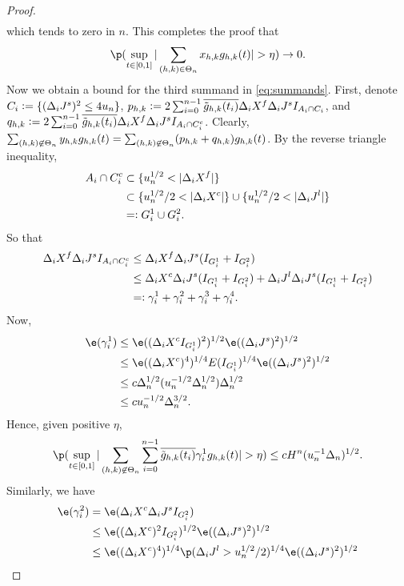 \begin{proof}
\begin{align}
\end{align}
which tends to zero in $n$.  This completes the proof that \begin{align}\label{eq:x} \p(\sup_{t \in [0,1]}\vert \sumt x_{h,k} \ghk(t) \vert > \eta) \to 0. \end{align}
Now we obtain a bound for the third summand in  \eqref{eq:summands}. First, denote $C_i := \{( \Delta_i J^s )^2 \le 4 u_n\}$, $p_{h,k} : = 2 \sum_{i = 0}^{n-1} \overline{\tilde{g}_{h,k}(t_i)}\Delta_i X^f \Delta_i J^s I_{A_i \cap C_i}$, and $q_{h,k} := 2 \sum_{i = 0}^{n-1} \overline{\tilde{g}_{h,k}(t_i)}\Delta_i X^f \Delta_i J^s I_{A_i \cap C_i^c}$. Clearly, $\sum_{(h,k) \not\in \Theta_n} y_{h,k} g_{h,k}(t)  = \sum_{(h,k) \not\in \Theta_n} (p_{h,k} + q_{h,k}) g_{h,k}(t)$. By the reverse triangle inequality,
\begin{align}
  A_i \cap C_i^c &\subset \{ u_n^{1/2} < \vert \Delta_i X^f \vert  \}\notag\\
  & \subset \{ u_n^{1/2}/2 < \vert \Delta_i X^c \vert  \} \cup  \{ u_n^{1/2}/2 < \vert \Delta_i J^l \vert  \}\notag\\
  &=: G^1_i \cup G^2_i\notag.
  \label{}
\end{align}
So that 
\begin{align}
  \Delta_i X^f \Delta_i J^s I_{A_i \cap C_i^c} &\le \Delta_i X^f \Delta_i J^s  (I_{G^1_i} +  I_{G^2_i}) \notag\\
  & \le \Delta_i X^c \Delta_i J^s(I_{G^1_i} +  I_{G^2_i}) + \Delta_i J^l \Delta_i J^s(I_{G^1_i} +  I_{G^2_i}) \notag \\
  & =: \gamma_i^1 + \gamma_i^2 + \gamma_i^3 + \gamma^4_i.\notag 
\end{align}
Now,
\begin{align}
  \e(\gamma_i^1) &\le  \e( (\dxc  I_{G^1_i})^2)^{1/2} \e( (\djt)^2)^{1/2} \notag\\
  &\le  \e( (\dxc)^4)^{1/4}  E(I_{G^1_i})^{1/4} \e( (\djt)^2)^{1/2} \notag\\
  & \le c \Delta_n^{1/2} (u^{-1/2}_n \Delta_n^{1/2}) \Delta_n^{1/2} \notag \\
  & \le c u^{-1/2}_n \Delta_n^{3/2}.
  \label{}
\end{align}
Hence, given positive $\eta$, 
\begin{align} 
  \p( \sup_{t \in \domain}\vert \sumnt \sumin \btghki \gamma^1_i \ghk(t)\vert > \eta) \le cH^n (u^{-1}_n\Delta_n)^{1/2}. \notag \end{align}
Similarly, we have 
\begin{align}
  \e(\gamma_i^2) & =  \e(\dxc \djt I_{G^2_i}) \notag\\
  & \le \e((\dxc)^2 I_{G^2_i})^{1/2} \e((\djt)^2)^{1/2}\notag \\
  &\le \e((\dxc)^4)^{1/4} \p(\djl > u_n^{1/2}/2)^{1/4} \e((\djt)^2)^{1/2}\notag\\

\end{align}
\end{proof}
